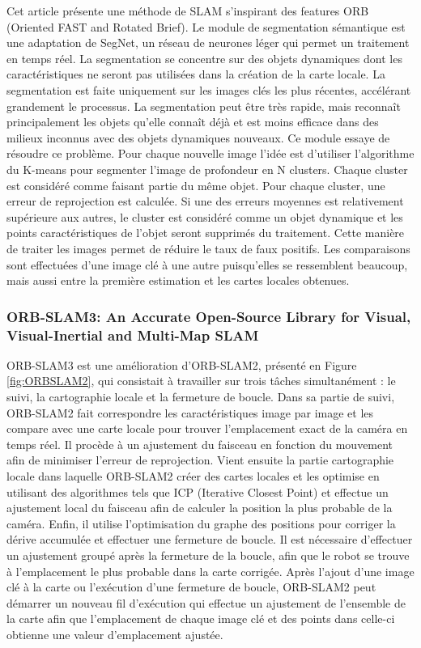 \documentclass[11pt]{article}
\begin{document}
  Cet article \cite{jiRealtimeSemanticRGBD2021} présente une méthode de SLAM s'inspirant des features ORB (Oriented FAST and Rotated Brief).
  Le module de segmentation sémantique est une adaptation de SegNet, un réseau de neurones léger qui permet un traitement en temps réel.
  La segmentation se concentre sur des objets dynamiques dont les caractéristiques ne seront pas utilisées dans la création de 
  la carte locale. La segmentation est faite uniquement sur les images clés les plus récentes, accélérant grandement le processus.
  La segmentation peut être très rapide, mais reconnaît principalement les objets qu'elle connaît déjà et est moins efficace dans des 
  milieux inconnus avec des objets dynamiques nouveaux. Ce module essaye de résoudre ce problème.
  Pour chaque nouvelle image l'idée est d'utiliser l'algorithme du K-means pour segmenter l'image de profondeur en N clusters.
  Chaque cluster est considéré comme faisant partie du même objet. Pour chaque cluster, une erreur de reprojection est calculée. Si une 
  des erreurs moyennes est relativement supérieure aux autres, le cluster est considéré comme un objet dynamique et les points caractéristiques
  de l'objet seront supprimés du traitement. Cette manière de traiter les images permet de réduire le taux de faux positifs. 
  Les comparaisons sont effectuées d'une image clé à une autre puisqu'elles se ressemblent beaucoup, mais aussi entre la première estimation
  et les cartes locales obtenues.

  \pagebreak

  \subsubsection{ORB-SLAM3: An Accurate Open-Source Library for Visual, Visual-Inertial and Multi-Map SLAM}

  ORB-SLAM3 \cite{camposORBSLAM3AccurateOpenSource2021} est une amélioration d'ORB-SLAM2, présenté en Figure \ref{fig:ORBSLAM2}, qui consistait à travailler sur trois tâches simultanément : 
  le suivi, la cartographie locale et la fermeture de boucle. Dans sa partie de suivi, ORB-SLAM2 fait correspondre les caractéristiques image 
  par image et les compare avec une carte locale pour trouver l'emplacement exact de la caméra en temps réel. Il procède à un ajustement 
  du faisceau en fonction du mouvement afin de minimiser l'erreur de reprojection. Vient ensuite la partie cartographie locale 
  dans laquelle ORB-SLAM2 
  créer des cartes locales et les optimise en utilisant des algorithmes tels que ICP (Iterative Closest Point) et effectue un ajustement 
  local du faisceau afin de calculer la position la plus probable de la caméra. Enfin, il utilise l'optimisation du graphe des positions 
  pour corriger la dérive accumulée et effectuer une fermeture de boucle. Il est nécessaire d'effectuer un ajustement groupé
  après la fermeture de la boucle, afin que le robot se trouve à l'emplacement le plus probable dans la carte corrigée. 
  Après l'ajout d'une image clé à la carte ou l'exécution d'une fermeture de boucle, 
  ORB-SLAM2 peut démarrer un nouveau fil d'exécution qui effectue un ajustement de l'ensemble de la carte afin que 
  l'emplacement de chaque image clé et des points dans celle-ci obtienne une valeur d'emplacement ajustée.
\end{document}
